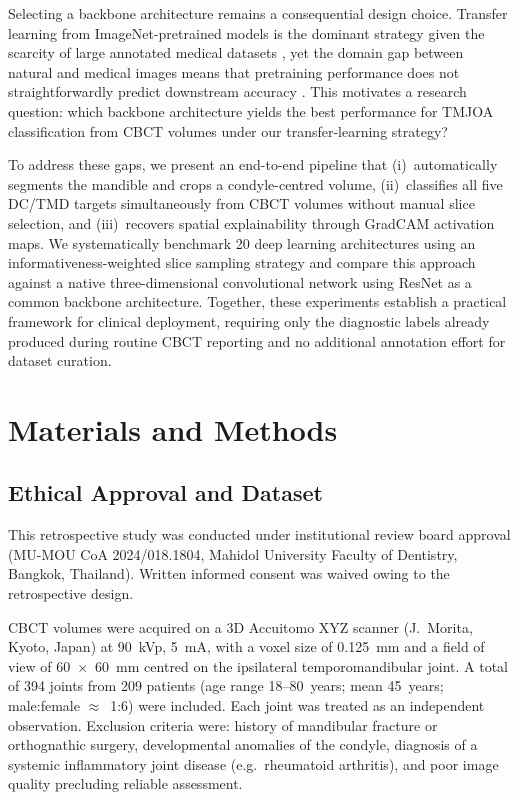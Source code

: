 \documentclass[review,12pt]{elsarticle}
\begin{document}
Selecting a backbone architecture remains a consequential design choice.
Transfer learning from ImageNet-pretrained models is the dominant
strategy given the scarcity of large annotated medical datasets
\cite{kim2022transfer}, yet the domain gap between natural and medical
images means that pretraining performance does not straightforwardly
predict downstream accuracy \cite{hosseinzadeh2021systematic}. This
motivates a research question: which backbone architecture
yields the best performance for TMJOA classification from CBCT
volumes under our transfer-learning strategy?

To address these gaps, we present an end-to-end pipeline that
(i)~automatically segments the mandible and crops a condyle-centred
volume, (ii)~classifies all five
DC/TMD targets simultaneously from CBCT volumes without manual slice
selection, and (iii)~recovers spatial explainability through
GradCAM \cite{Selvaraju_2019} activation maps. We systematically
benchmark 20 deep learning architectures using an
informativeness-weighted slice sampling strategy and
compare this approach against a native three-dimensional convolutional
network using ResNet as a common backbone architecture. Together, these experiments establish a practical framework for
clinical deployment, requiring only the diagnostic labels already
produced during routine CBCT reporting and no additional annotation
effort for dataset curation.

\section{Materials and Methods}
\label{sec:methods}

\subsection{Ethical Approval and Dataset}
\label{sec:data}

This retrospective study was conducted under institutional review board
approval (MU-MOU CoA 2024/018.1804, Mahidol University Faculty of
Dentistry, Bangkok, Thailand). Written informed consent was waived owing
to the retrospective design.

CBCT volumes were acquired on a 3D Accuitomo XYZ scanner (J.~Morita,
Kyoto, Japan) at 90~kVp, 5~mA, with a voxel size of 0.125~mm and a
field of view of 60~$\times$~60~mm centred on the ipsilateral
temporomandibular joint. A total of 394 joints from 209 patients (age
range 18--80~years; mean 45~years; male:female $\approx$~1:6) were
included. Each joint was treated as an independent observation. Exclusion
criteria were: history of mandibular fracture or orthognathic surgery,
developmental anomalies of the condyle, diagnosis of a systemic
inflammatory joint disease (e.g.\ rheumatoid arthritis), and poor
image quality precluding reliable assessment.
\end{document}
